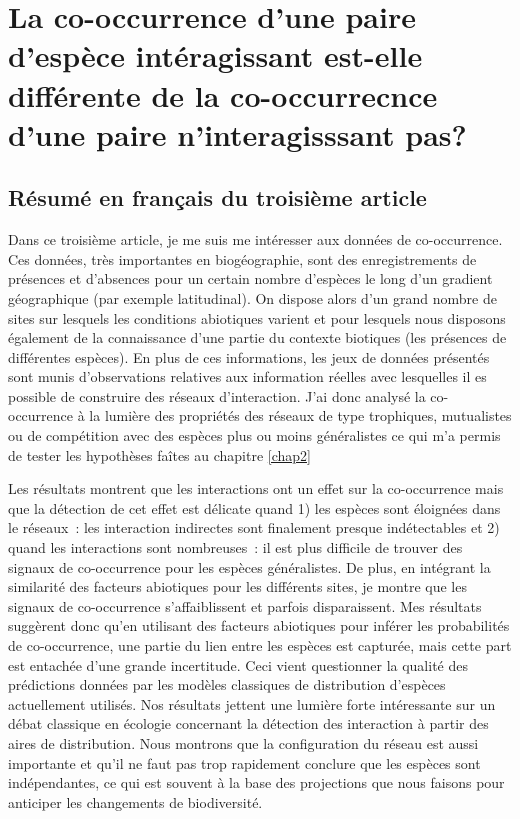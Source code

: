 \chapter{La co-occurrence d'une paire d'espèce intéragissant est-elle différente de la co-occurrecnce d'une paire n'interagisssant pas?}
\label{chap3}

\section{Résumé en français du troisième article}

Dans ce troisième article, je me suis me intéresser aux données de co-occurrence.
Ces données, très importantes en biogéographie, sont des enregistrements
de présences et d'absences pour un certain nombre d'espèces
le long d'un gradient géographique (par exemple latitudinal).
On dispose alors d’un grand nombre de sites sur lesquels les conditions abiotiques
varient et pour lesquels nous disposons également de la connaissance
d’une partie du contexte biotiques (les présences de différentes espèces).
En plus de ces informations, les jeux de données présentés sont munis
d’observations relatives aux information réelles avec lesquelles il es possible
de construire des réseaux d'interaction. J'ai donc analysé la co-occurrence à la
lumière des propriétés des réseaux de type trophiques, mutualistes ou de compétition
avec des espèces plus ou moins généralistes ce qui m’a permis de tester les
hypothèses faîtes au chapitre \ref{chap2}


Les résultats montrent que les interactions ont un effet sur la co-occurrence
mais que la détection de cet effet est délicate quand 1) les espèces sont éloignées
dans le réseaux : les interaction indirectes sont finalement presque
indétectables et 2) quand les interactions sont nombreuses : il est plus
difficile de trouver des signaux de co-occurrence pour les espèces généralistes.
De plus, en intégrant la similarité des facteurs abiotiques
pour les différents sites, je montre que les signaux de co-occurrence
s’affaiblissent et parfois disparaissent. Mes résultats suggèrent donc qu’en
utilisant des facteurs abiotiques pour inférer les probabilités de co-occurrence,
une partie du lien entre les espèces est capturée, mais cette part est entachée
d’une grande incertitude. Ceci vient questionner la qualité des prédictions
données par les modèles classiques de distribution d'espèces actuellement utilisés.
Nos résultats jettent une lumière forte intéressante sur un débat classique en
écologie concernant la détection des interaction à partir des aires de
distribution. Nous montrons que la configuration du réseau est aussi
importante et qu’il ne faut pas trop rapidement conclure que les espèces sont
indépendantes, ce qui est souvent à la base des projections que nous faisons
pour anticiper les changements de biodiversité.





